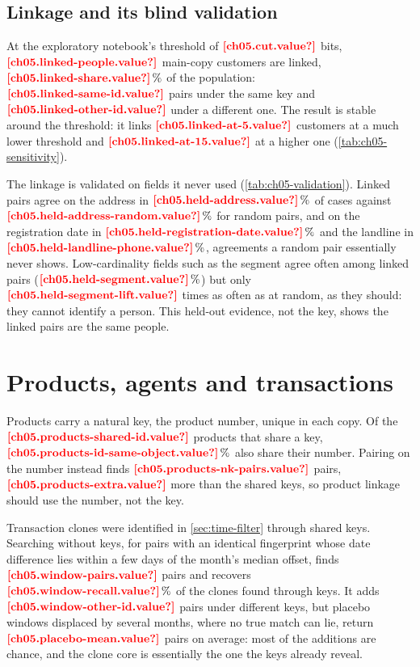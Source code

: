 \subsection{Linkage and its blind validation}

At the exploratory notebook's threshold of $\est{ch05.cut}{value}$ bits, $\est{ch05.linked-people}{value}$ main-copy
customers are linked, $\est{ch05.linked-share}{value}\,\%$ of the population:
$\est{ch05.linked-same-id}{value}$ pairs under the same key and $\est{ch05.linked-other-id}{value}$ under a different
one. The result is stable around the threshold: it links $\est{ch05.linked-at-5}{value}$ customers at a much lower
threshold and $\est{ch05.linked-at-15}{value}$ at a higher one (\cref{tab:ch05-sensitivity}).



The linkage is validated on fields it never used (\cref{tab:ch05-validation}). Linked pairs agree on the address in
$\est{ch05.held-address}{value}\,\%$ of cases against $\est{ch05.held-address-random}{value}\,\%$ for random pairs,
and on the registration date in $\est{ch05.held-registration-date}{value}\,\%$ and the landline in
$\est{ch05.held-landline-phone}{value}\,\%$, agreements a random pair essentially never shows. Low-cardinality fields
such as the segment agree often among linked pairs ($\est{ch05.held-segment}{value}\,\%$) but only
$\est{ch05.held-segment-lift}{value}$ times as often as at random, as they should: they cannot identify a person. This
held-out evidence, not the key, shows the linked pairs are the same people.



\section{Products, agents and transactions}\label{sec:rl-other}

Products carry a natural key, the product number, unique in each copy. Of the $\est{ch05.products-shared-id}{value}$
products that share a key, $\est{ch05.products-id-same-object}{value}\,\%$ also share their number. Pairing on the number
instead finds $\est{ch05.products-nk-pairs}{value}$ pairs, $\est{ch05.products-extra}{value}$ more than the shared keys,
so product linkage should use the number, not the key.

Transaction clones were identified in \cref{sec:time-filter} through shared keys. Searching without keys, for pairs
with an identical fingerprint whose date difference lies within a few days of the month's median offset, finds
$\est{ch05.window-pairs}{value}$ pairs and recovers $\est{ch05.window-recall}{value}\,\%$ of the clones found through
keys. It adds $\est{ch05.window-other-id}{value}$ pairs under different keys, but placebo windows displaced by several
months, where no true match can lie, return $\est{ch05.placebo-mean}{value}$ pairs on average: most of the additions are
chance, and the clone core is essentially the one the keys already reveal.

